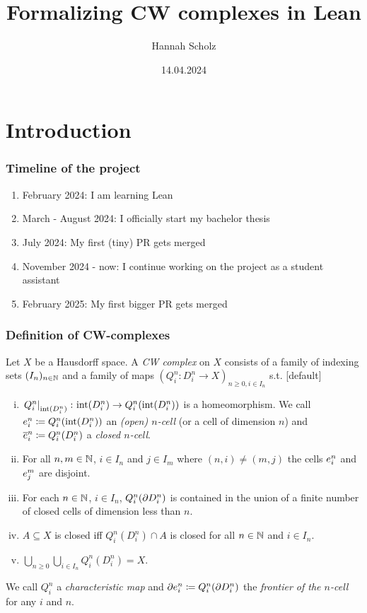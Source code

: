 \documentclass{beamer}
\title{Formalizing CW complexes in Lean}
\author{Hannah Scholz}
\institute[MI]{Mathematical Institute of the University of Bonn}
\date{14.04.2024}
\begin{document}
\frame{\titlepage}

\section{Introduction}

\begin{frame}
\frametitle{Timeline of the project}
\begin{enumerate}
  \item[\textbullet] February 2024: I am learning Lean
  \item[\textbullet] March - August 2024: I officially start my bachelor thesis
  \item[\textbullet] July 2024: My first (tiny) PR gets merged 
  \item[\textbullet] November 2024 - now: I continue working on the project as a student assistant
  \item[\textbullet] February 2025: My first bigger PR gets merged
\end{enumerate}
\end{frame}

\begin{frame}
\frametitle{Definition of CW-complexes}
\fontsize{10pt}{5}\selectfont
  Let $X$ be a Hausdorff space.
    A \emph{CW complex} on $X$ consists of a family of indexing sets $(I_n)_{n \in \bN}$ and a family of maps $(Q_i^n\colon D_i^n\rightarrow X)_{n \ge 0, i \in I_n}$ s.t.
    [default]
    \begin{enumerate}[(i)]
        \item $\restrict{Q_i^n}{\interior{D_i^n}}\colon \interior{D_i^n} \rightarrow Q_i^n(\interior{D_i^n})$ is a homeomorphism. We call $\openCell{n}{i} \coloneq Q_i^n(\interior{D_i^n})$ an \emph{(open) $n$-cell} (or a cell of dimension $n$)
        and $\closedCell{n}{i} \coloneq Q_i^n(D_i^n)$ a \emph{closed $n$-cell}.
        \item For all $n, m \in \bN$, $i \in I_n$ and $j \in I_m$ where $(n, i) \ne (m, j)$ the cells $\openCell{n}{i}$ and $\openCell{m}{j}$ are disjoint.
        \item For each $n \in \bN$, $i \in I_n$, $Q_i^n(\boundary D_i^n)$ is contained in the union of a finite number of closed cells of dimension less than $n$.
        \item $A \subseteq X$ is closed iff $Q_i^n(D_i^n) \cap A$ is closed for all $n \in \bN$ and $i \in I_n$.
        \item $\bigcup_{n \ge 0}\bigcup_{i \in I_n} Q_i^n(D_i^n) = X$.
    \end{enumerate}
    We call $Q_i^n$ a \emph{characteristic map} and $\cellFrontier{n}{i} \coloneq Q_i^n(\boundary D_i^n)$ the \emph{frontier of the $n$-cell} for any $i$ and $n$.
\end{frame}
\end{document}
